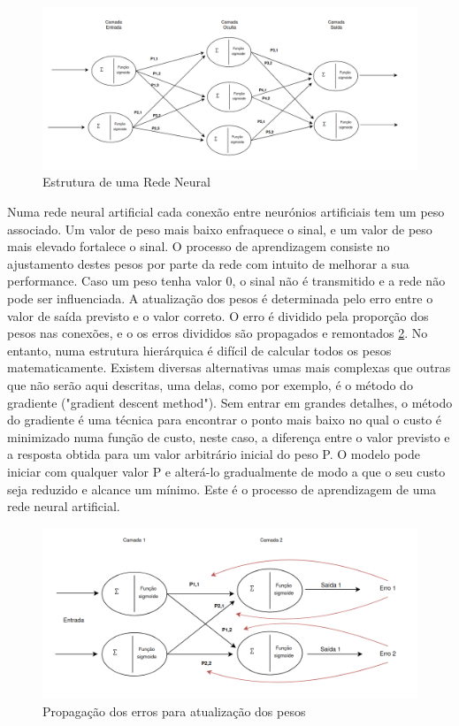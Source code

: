 \begin{figure}[H]
\centering
\includegraphics[scale=0.42]{figs/redeNeuralDraw}
\caption{Estrutura de uma Rede Neural}\label{ANN}
\end{figure}



Numa rede neural artificial cada conexão entre neurónios artificiais tem um peso associado. Um valor de peso mais baixo enfraquece o sinal, e um valor de peso mais elevado fortalece o sinal. O processo de aprendizagem consiste no ajustamento destes pesos por parte da rede com intuito de melhorar a sua performance. Caso um peso tenha valor 0, o sinal não é transmitido e a rede não pode ser influenciada. A atualização dos pesos é determinada pelo erro entre o valor de saída previsto e o valor correto. O erro é dividido pela proporção dos pesos nas conexões, e o os erros divididos são propagados e remontados \ref{propagaçao}. No entanto, numa estrutura hierárquica é difícil de calcular todos os pesos matematicamente. Existem diversas alternativas umas mais complexas que outras que não serão aqui descritas, uma delas, como por exemplo, é o método do gradiente ("gradient descent method"). Sem entrar em grandes detalhes, o método do gradiente é uma técnica para encontrar o ponto mais baixo no qual o custo é minimizado numa função de custo, neste caso, a diferença entre o valor previsto e a resposta obtida para um valor arbitrário inicial do peso P. O modelo pode iniciar com qualquer valor P e alterá-lo gradualmente de modo a que o seu custo seja reduzido e alcance um mínimo. Este é o processo de aprendizagem de uma rede neural artificial.


\begin{figure}[H]
\centering
\includegraphics[scale=0.42]{figs/propagação}
\caption{Propagação dos erros para atualização dos pesos}\label{propagaçao}
\end{figure}




